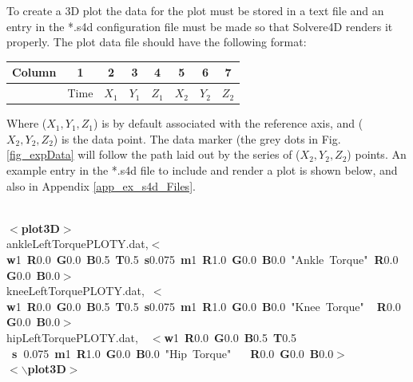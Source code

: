 \documentclass[singlecolumn,12pt]{article}
\newcommand{\hlstd}[1]{\textcolor[rgb]{0,0,0}{#1}}
\newcommand{\hlkey}[1]{\textcolor[rgb]{0,0,1}{\bf{#1}}}
\newcommand{\hlnum}[1]{\textcolor[rgb]{0.66,0,0.66}{#1}}
\newcommand{\hlstr}[1]{\textcolor[rgb]{1,0,0}{#1}}
\begin{document}
To create a 3D plot the data for the plot must be stored in a text
file and an entry in the *.s4d configuration file must be made so
that Solvere4D renders it properly. The plot data file should have
the following format:

\vspace{1cm}
\begin{center}
\begin{tabular}{c|c|c|c|c|c|c|c|}
\hline Column & 1 & 2 & 3 & 4 & 5 & 6 & 7 \\
\hline & Time & $X_1$ & $Y_1$ & $Z_1$ & $X_2$ & $Y_2$ & $Z_2$\\
\end{tabular}
\end{center}
\vspace{1cm}

Where ($X_1, Y_1, Z_1$) is by default associated with the reference
axis, and ($X_2, Y_2, Z_2$) is the data point. The data marker (the
grey dots in Fig. \ref{fig_expData} will follow the path laid out by
the series of ($X_2, Y_2, Z_2$) points. An example entry in the
*.s4d file to include and render a plot is shown below, and also in
Appendix \ref{app_ex_s4d_Files}.

\vspace{1cm}
\footnotesize
\hlstd{\\
}\hlkey{$<$plot3D$>$}\hlstd{\\
\hlstd{}ankleLeftTorquePLOTY.dat,}\hlkey{$<$w}\hlnum{1\ }\hlkey{R}\hlnum{0.0\ }\hlkey{G}\hlnum{0.0\ }\hlkey{B}\hlnum{0.5\ }\hlkey{T}\hlnum{0.5\ }\hlkey{s}\hlnum{0.075\ }\hlkey{m}\hlnum{1\ }\hlkey{R}\hlnum{1.0\ }\hlkey{G}\hlnum{0.0\ }\hlkey{B}\hlnum{0.0\ }\hlkey{}\hlstr{"Ankle\ Torque"}\hlkey{\ R}\hlnum{0.0\ }\hlkey{G}\hlnum{0.0\ }\hlkey{B}\hlnum{0.0}\hlkey{$>$}\hlstd{\\
\hlstd{ }kneeLeftTorquePLOTY.dat,\ }\hlkey{$<$w}\hlnum{1\ }\hlkey{R}\hlnum{0.0\ }\hlkey{G}\hlnum{0.0\ }\hlkey{B}\hlnum{0.5\ }\hlkey{T}\hlnum{0.5\ }\hlkey{s}\hlnum{0.075\ }\hlkey{m}\hlnum{1\ }\hlkey{R}\hlnum{1.0\ }\hlkey{G}\hlnum{0.0\ }\hlkey{B}\hlnum{0.0\ }\hlkey{}\hlstr{"Knee\ Torque"}\hlkey{\hlstd{\ \ }R}\hlnum{0.0\ }\hlkey{G}\hlnum{0.0\ }\hlkey{B}\hlnum{0.0}\hlkey{$>$}\hlstd{\\
\hlstd{ }hipLeftTorquePLOTY.dat,\hlstd{\ \ }}\hlkey{$<$w}\hlnum{1\ }\hlkey{R}\hlnum{0.0\ }\hlkey{G}\hlnum{0.0\ }\hlkey{B}\hlnum{0.5\ }\hlkey{T}\hlnum{0.5 \ }\hlkey{s\ }\hlnum{0.075\ }\hlkey{m}\hlnum{1\ }\hlkey{R}\hlnum{1.0\ }\hlkey{G}\hlnum{0.0\ }\hlkey{B}\hlnum{0.0\ }\hlkey{}\hlstr{"Hip\ Torque"}\hlkey{\hlstd{\ \ \ }R}\hlnum{0.0\ }\hlkey{G}\hlnum{0.0\ }\hlkey{B}\hlnum{0.0}\hlkey{$>$}\hlstd{\\
}\hlkey{$<$$\backslash$plot3D$>$}
\normalsize
\vspace{1cm}
\end{document}
